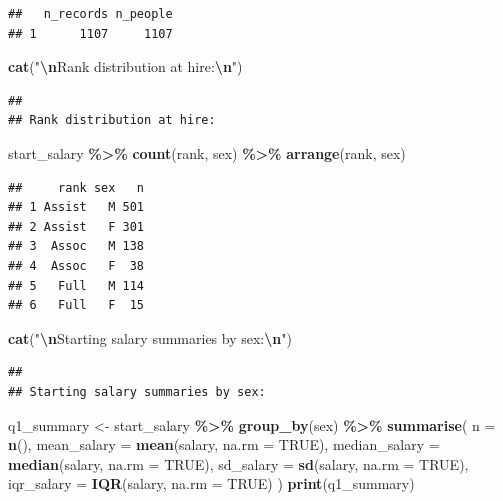 \documentclass[
]{article}
\newenvironment{Shaded}{\begin{snugshade}}{\end{snugshade}}
\newcommand{\AttributeTok}[1]{\textcolor[rgb]{0.13,0.29,0.53}{#1}}
\newcommand{\ConstantTok}[1]{\textcolor[rgb]{0.56,0.35,0.01}{#1}}
\newcommand{\FunctionTok}[1]{\textcolor[rgb]{0.13,0.29,0.53}{\textbf{#1}}}
\newcommand{\NormalTok}[1]{#1}
\newcommand{\OtherTok}[1]{\textcolor[rgb]{0.56,0.35,0.01}{#1}}
\newcommand{\SpecialCharTok}[1]{\textcolor[rgb]{0.81,0.36,0.00}{\textbf{#1}}}
\newcommand{\StringTok}[1]{\textcolor[rgb]{0.31,0.60,0.02}{#1}}
\begin{document}
\begin{verbatim}
##   n_records n_people
## 1      1107     1107
\end{verbatim}

\begin{Shaded}
\begin{Highlighting}[]
\FunctionTok{cat}\NormalTok{(}\StringTok{"}\SpecialCharTok{\textbackslash{}n}\StringTok{Rank distribution at hire:}\SpecialCharTok{\textbackslash{}n}\StringTok{"}\NormalTok{)}
\end{Highlighting}
\end{Shaded}

\begin{verbatim}
## 
## Rank distribution at hire:
\end{verbatim}

\begin{Shaded}
\begin{Highlighting}[]
\NormalTok{start\_salary }\SpecialCharTok{\%\textgreater{}\%}
  \FunctionTok{count}\NormalTok{(rank, sex) }\SpecialCharTok{\%\textgreater{}\%}
  \FunctionTok{arrange}\NormalTok{(rank, sex)}
\end{Highlighting}
\end{Shaded}

\begin{verbatim}
##     rank sex   n
## 1 Assist   M 501
## 2 Assist   F 301
## 3  Assoc   M 138
## 4  Assoc   F  38
## 5   Full   M 114
## 6   Full   F  15
\end{verbatim}

\begin{Shaded}
\begin{Highlighting}[]
\FunctionTok{cat}\NormalTok{(}\StringTok{"}\SpecialCharTok{\textbackslash{}n}\StringTok{Starting salary summaries by sex:}\SpecialCharTok{\textbackslash{}n}\StringTok{"}\NormalTok{)}
\end{Highlighting}
\end{Shaded}

\begin{verbatim}
## 
## Starting salary summaries by sex:
\end{verbatim}

\begin{Shaded}
\begin{Highlighting}[]
\NormalTok{q1\_summary }\OtherTok{\textless{}{-}}\NormalTok{ start\_salary }\SpecialCharTok{\%\textgreater{}\%}
  \FunctionTok{group\_by}\NormalTok{(sex) }\SpecialCharTok{\%\textgreater{}\%}
  \FunctionTok{summarise}\NormalTok{(}
    \AttributeTok{n =} \FunctionTok{n}\NormalTok{(),}
    \AttributeTok{mean\_salary =} \FunctionTok{mean}\NormalTok{(salary, }\AttributeTok{na.rm =} \ConstantTok{TRUE}\NormalTok{),}
    \AttributeTok{median\_salary =} \FunctionTok{median}\NormalTok{(salary, }\AttributeTok{na.rm =} \ConstantTok{TRUE}\NormalTok{),}
    \AttributeTok{sd\_salary =} \FunctionTok{sd}\NormalTok{(salary, }\AttributeTok{na.rm =} \ConstantTok{TRUE}\NormalTok{),}
    \AttributeTok{iqr\_salary =} \FunctionTok{IQR}\NormalTok{(salary, }\AttributeTok{na.rm =} \ConstantTok{TRUE}\NormalTok{)}
\NormalTok{  )}
\FunctionTok{print}\NormalTok{(q1\_summary)}
\end{Highlighting}
\end{Shaded}
\end{document}
